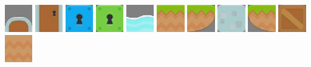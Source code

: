 \documentclass[10pt]{book}
\begin{document}
\begin{CJK}{UTF8}{gkai}
\begin{center}
\includegraphics[width=0.09\textwidth]{previews/kenney-TILES-09.png}
\includegraphics[width=0.09\textwidth]{previews/kenney-TILES-10.png}
\includegraphics[width=0.09\textwidth]{previews/kenney-TILES-11.png}
\includegraphics[width=0.09\textwidth]{previews/kenney-TILES-12.png}
\includegraphics[width=0.09\textwidth]{previews/kenney-TILES-13.png}
\includegraphics[width=0.09\textwidth]{previews/kenney-TILES-14.png}
\includegraphics[width=0.09\textwidth]{previews/kenney-TILES-15.png}
\includegraphics[width=0.09\textwidth]{previews/kenney-TILES-16.png}
\includegraphics[width=0.09\textwidth]{previews/kenney-TILES-17.png}
\includegraphics[width=0.09\textwidth]{previews/kenney-TILES-18.png}
\includegraphics[width=0.09\textwidth]{previews/kenney-TILES-19.png}
\end{center}


\end{CJK}
\end{document}
